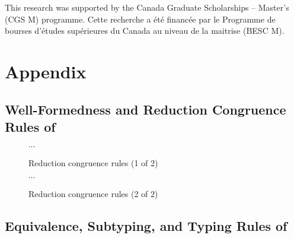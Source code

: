 \documentclass[acmsmall,review,anonymous]{acmart}\settopmatter{printfolios=true,printccs=false,printacmref=false}
\begin{document}
\begin{acks}
This research was supported by the Canada Graduate Scholarships -- Master’s (CGS M) programme.
Cette recherche a \'et\'e financ\'ee par le Programme de bourses d'\'etudes sup\'erieures
du Canada au niveau de la maitrise (BESC M).
\end{acks}



\clearpage
\appendix
\section{Appendix}




\allowdisplaybreaks

\subsection{Well-Formedness and Reduction Congruence Rules of \lang} \label{app:cong:red}

\begin{figure}[h]
\centering
\fbox{$\red{\Phi; \Gamma}{\tau}{\tau}$} \qquad $\cdots$ \hfill
{}
\caption{Reduction congruence rules (1 of 2)}
\label{fig:cong:red*}
\end{figure}

\begin{figure}[h]
\centering
\fbox{$\red{\Phi; \Gamma}{\tau}{\tau}$} \qquad $\cdots$ \hfill
{}
\caption{Reduction congruence rules (2 of 2)}
\label{fig:cong:red*}
\end{figure}

\clearpage
\subsection{Equivalence, Subtyping, and Typing Rules of \CICE} \label{app:equiv}
\end{document}
